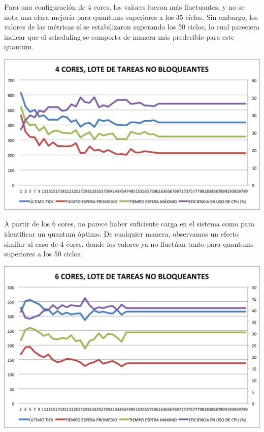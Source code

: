 Para una configuraci\'on de 4 cores, los valores fueron m\'as fluctuantes, y no se nota una clara mejor\'ia para quantums superiores a los 35 ciclos. Sin embargo, los valores de las m\'etricas s\'i se estabilizaron superando los 50 ciclos, lo cual pareciera indicar que el scheduling se comporta de manera m\'as predecible para este quantum.
\begin{center}
	\includegraphics[scale=0.4]{graficos/4cores_loteNoBloqueante.png}
\end{center}

A partir de los 6 cores, no parece haber suficiente carga en el sistema como para identificar un quantum \'optimo. De cualquier manera, observamos un efecto similar al caso de 4 cores, donde los valores ya no fluct\'uan tanto para quantums superiores a los 50 ciclos. 
\begin{center}
	\includegraphics[scale=0.4]{graficos/6cores_loteNoBloqueante.png} \\
\end{center}


